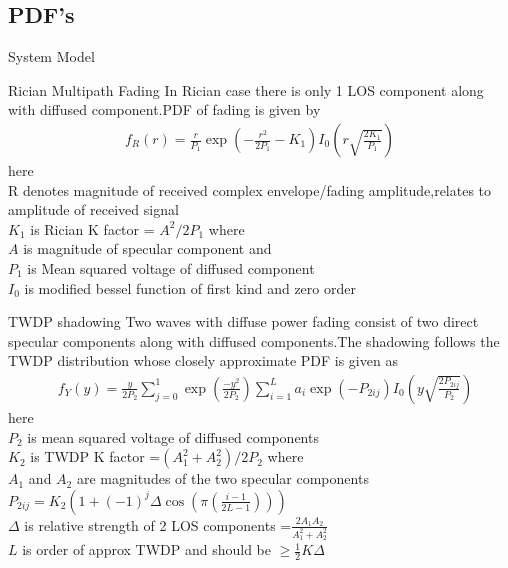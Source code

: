 \documentclass{beamer}
\begin{document}
\subsection{PDF's}
\begin{frame}{System Model}
\begin{block}{Rician Multipath Fading}
In Rician case there is only 1 LOS component along with diffused component.PDF of fading is given by
\begin{align}
    f_{R} (r)=\frac{r}{P_1} \exp\left(-\frac{r^2}{2 P_1} - K_1\right) I_0 \left( r\sqrt{\frac{2K_1}{P_1}}\right) \label{rician}
\end{align}
here \\
R denotes magnitude of received complex envelope/fading amplitude,relates to amplitude of received signal\\
\({K}_1\) is Rician K factor = \({A^2}/{2P_1}\) where\\
\(A\) is magnitude of specular component  and\\
\(P_1\) is Mean squared voltage of diffused component\\
\(I_0\) is modified bessel function of first kind and zero order
\end{block}
\end{frame}
\begin{frame}
\begin{block}{TWDP shadowing}
  Two waves with diffuse power fading consist of two direct specular  components  along  with  diffused  components.The shadowing follows the TWDP distribution whose closely approximate PDF is given as\\
  \begin{align}
      & f_Y(y)=\frac{y}{2P_2} \sum_{j=0}^{1} \exp\left(\frac{-y^2}{2P_2}\right)
       \sum_{i=1}^{L} a_i \exp(-P_{2ij}) I_0\left( y \sqrt{\frac{2P_{2ij}}{P_2}}\right) \label{TWDP}
  \end{align}
  here\\
  \(P_2\) is mean squared voltage of diffused components\\
  \(K_2\) is TWDP K factor =\((A_1^2 +A_2^2)/{2P_2}\) where\\
  \(A_1\) and \(A_2\) are magnitudes of the two specular components\\
  \(P_{2ij}=K_2 \left(1+ (-1)^j \Delta \cos \left(\pi\left( \frac{i-1}{2L-1}\right)\right)\right)\)\\
  \(\Delta\) is relative strength of 2 LOS components =\(\frac{2 A_{1} A_{2}}{A_1^2 +A_2^2}\)\\
  \(L\) is order of approx TWDP and should be \(\geq \frac{1}{2} K\Delta\)
\end{block}
\end{frame}
\end{document}
